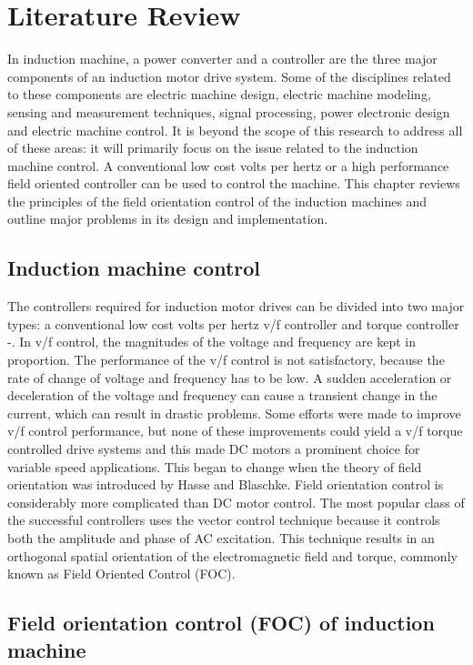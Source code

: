 
\chapter{Literature Review} 

In induction machine, a power converter and a controller are the three major components of an induction motor drive system. Some of the disciplines related to these components are electric machine design, electric machine modeling, sensing and measurement techniques, signal processing, power electronic design and electric machine control. It is beyond the scope of this research to address all of these areas: it will primarily focus on the issue related to the induction machine control. A conventional low cost volts per hertz or a high performance field oriented controller can be used to control the machine. This chapter reviews the principles of the field orientation control of the induction machines and outline major problems in its design and implementation.


\section{Induction machine control}

The controllers required for induction motor drives can be divided into two major types: a conventional low cost volts per hertz v/f controller and torque controller \cite{Vas}-\cite{Lipo}. In v/f control, the magnitudes of the voltage and frequency are kept in proportion. The performance of the v/f control is not satisfactory, because the rate of change of voltage and frequency has to be low. A sudden acceleration or deceleration of the voltage and frequency can cause a transient change in the current, which can result in drastic problems. Some efforts were made to improve v/f control performance, but none of these improvements could yield a v/f torque controlled drive systems and this made DC motors a prominent choice for variable speed applications. This began to change when the theory of field orientation was introduced by Hasse and Blaschke. Field orientation control is considerably more complicated than DC motor control. The most popular class of the successful controllers uses the vector control technique because it controls both the amplitude and phase of AC excitation. This technique results in an orthogonal spatial orientation of the electromagnetic field and torque, commonly known as Field Oriented Control (FOC).


\section{Field orientation control (FOC) of induction machine}


